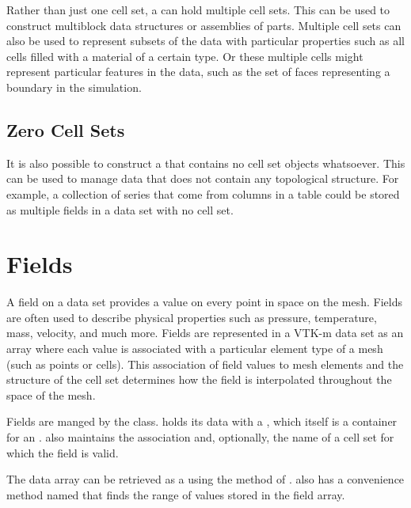 Rather than just one cell set, a  can hold multiple cell
sets. This can be used to construct multiblock data structures or
assemblies of parts. Multiple cell sets can also be used to represent
subsets of the data with particular properties such as all cells filled
with a material of a certain type. Or these multiple cells might represent
particular features in the data, such as the set of faces representing a
boundary in the simulation.

\subsection{Zero Cell Sets}

It is also possible to construct a  that contains no cell
set objects whatsoever. This can be used to manage data that does not
contain any topological structure. For example, a collection of series that
come from columns in a table could be stored as multiple fields in a data
set with no cell set.


\section{Fields}
\label{sec:DataSets:Fields}


A field on a data set provides a value on every point in space on the mesh.
Fields are often used to describe physical properties such as pressure,
temperature, mass, velocity, and much more. Fields are represented in a
VTK-m data set as an array where each value is associated with a particular
element type of a mesh (such as points or cells). This association of field
values to mesh elements and the structure of the cell set determines how
the field is interpolated throughout the space of the mesh.

Fields are manged by the  class. 
holds its data with a , which itself is
a container for an . 
also maintains the association and, optionally, the name of a cell set for
which the field is valid.

The data array can be retrieved as a 
using the  method of .
 also has a convenience method named
 that finds the range of values stored in the field
array.

